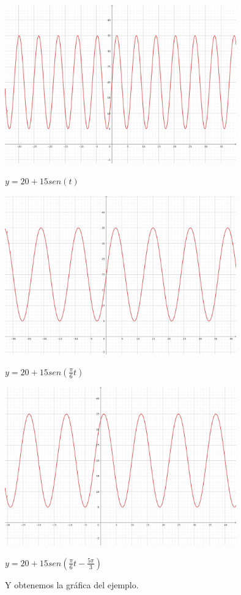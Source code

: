 \begin{center}
     \includegraphics[width=10cm]{recursos/y_Aseno.png}\par
     $ y = 20 + 15sen(t) $
\end{center}

\begin{center}
     \includegraphics[width=10cm]{recursos/y_Aseno_o.png}\par
     $ y = 20 + 15sen(\frac{\pi}{6}t) $
\end{center}

\begin{center}
     \includegraphics[width=10cm]{recursos/y_Aseno_o_phi.png}\par
     $ y = 20 + 15sen(\frac{\pi}{6}t - \frac{5\pi}{3}) $
\end{center}

\begin{center}
 Y obtenemos la gráfica del ejemplo.
\end{center}